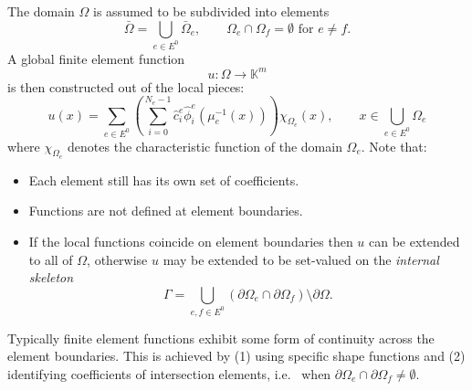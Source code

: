 The domain $\Omega$ is assumed to be subdivided into elements
\begin{equation}
\bar{\Omega} = \bigcup_{e\in E^0} \bar\Omega_e, \qquad
\Omega_e\cap\Omega_f = \emptyset \text{ for $e\neq f$}.
\end{equation}
A global finite element function $$u : \Omega \to \mathbb{K}^m$$ is then
constructed out of the local pieces:
\begin{equation}
u(x) = \sum_{e\in E^0} \left( \sum_{i=0}^{N_e-1} \hat{c}_i^e
\hat\phi_i^e(\mu_e^{-1}(x)) \right) \chi_{\Omega_e}(x), 
\qquad x\in \bigcup_{e\in E^0} \Omega_e
\end{equation}
where $\chi_{\Omega_e}$ denotes the characteristic function of the
domain $\Omega_e$. Note that:
\begin{itemize}
\item Each element still has its own set of coefficients.
\item Functions are not defined at element boundaries.
\item If the local functions coincide on element boundaries then $u$
  can be extended to all of $\Omega$, otherwise $u$ may be extended to
  be set-valued on the \textit{internal skeleton}
\begin{equation}
\Gamma = \bigcup_{e,f\in E^0} \left( \partial\Omega_e \cap
\partial\Omega_f \right) \setminus \partial\Omega .
\end{equation}
\end{itemize}

Typically finite element functions exhibit some form of continuity
across the element boundaries. This is achieved by (1) using specific
shape functions and (2) identifying coefficients of intersection
elements, i.e.~ when $\partial\Omega_e\cap\partial\Omega_f\neq\emptyset$.

